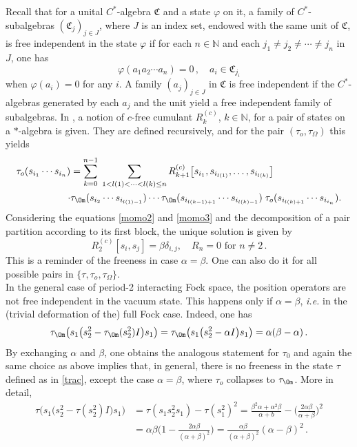 \documentclass[12pt]{amsart}
\numberwithin{equation}{section}
\def\gc{{\mathfrak C}}
\def\bn{{\mathbb N}}
\def\a{\alpha}
\def\b{\beta}
\def\t{\tau}
\def\f{\varphi} \def\ff{\phi} \def\F{\Phi}
\theoremstyle{definition}
\begin{document}
Recall that for a unital $C^*$-algebra $\gc$ and a state $\f$ on it, a family of $C^*$-subalgebras $(\gc_j)_{j\in J}$, where $J$ is an index set, endowed with the same unit of $\gc$, is free independent in the state $\f$ if for each $n\in\bn$ and each $j_1\neq j_2\neq \cdots \neq j_n$ in $J$, one has
$$
\f(a_1a_2\cdots a_n)=0\,, \quad a_i\in \gc_{j_i}
$$
when $\f(a_i)=0$ for any $i$. A family $(a_j)_{j\in J}$ in $\gc$ is free independent if the $C^*$-algebras generated by each $a_j$ and the unit yield a free independent family of subalgebras. In \cite[Section 3]{BLS}, a notion of $c$-free cumulant $R^{(c)}_k$, $k\in\bn$, for a pair of states on a $*$-algebra is given. They are defined recursively, and for the pair $(\t_o,\tau_\Omega)$ this yields
\begin{align}\label{wick0}
\begin{split}
\t_o(s_{i_1} \cdots s_{i_n})&=\sum_{k=0}^{n-1}
\;
\sum_{1 < l(1) < \cdots < l(k) \leq n}
R^{(c)}_{k+1}\big[s_{i_1}, s_{i_{l(1)}}, \ldots, s_{i_{l(k)}}\big]\\
\cdot& \t_\Om (s_{i_2} \cdots s_{i_{l(1)-1}})
\cdots
\t_\Om(s_{i_{l(k-1)+1}} \cdots s_{i_{l(k)-1}})
\;
\t_o(s_{i_{l(k)+1} } \cdots s_{i_{i_n}}).
\end{split}
\end{align}
Considering the equations \eqref{momo2} and \eqref{momo3} and the decomposition
of a pair partition according to its first block, the unique solution is  given by
$$
R_2^{(c)}[s_i,s_j]=\b \delta_{i,j}, \quad R_{n}=0 \textrm{ for } n\neq 2\,.
$$
This is a reminder of the freeness in case $\a=\b$. One can also do it for all
possible pairs in $\{\t,\t_o,\t_\Omega\}$.\\
In the general case of period-2 interacting Fock space, the position operators are not free independent in the vacuum state. This happens only if $\a=\b$, \textit{i.e.} in the (trivial deformation of the) full Fock case. Indeed, one has
$$
\t_\Om\big(s_1\big(s_2^2-\t_\Om(s_2^2)I\big)s_1\big)=\t_\Om\big(s_1\big(s_2^2-\a I\big)s_1\big)=\a(\b-\a)\,.
$$
By exchanging $\a$ and $\b$, one obtains the analogous statement for $\tau_0$ and again the same choice as above implies that, in general, there is no freeness in the state $\t$ defined as in \eqref{trac}, except the case $\a=\b$, where $\t_o$ collapses to $\t_\Om$. More in detail,
\begin{align*}
\t\big(s_1\big(s_2^2-\t(s_2^2)I\big)s_1\big)&= \t(s_1s_2^2s_1)- \t(s_1^2)^2
=\frac{\b^2\a+\a^2\b}{\a+b}-\bigg(\frac{2\a\b}{\a+\b}\bigg)^2\\
&=\a\b\bigg(1-\frac{2\a\b}{(\a+\b)^2}\bigg)=\frac{\a\b}{(\a+\b)^2}(\a-\b)^2\,.
\end{align*}
\end{document}
